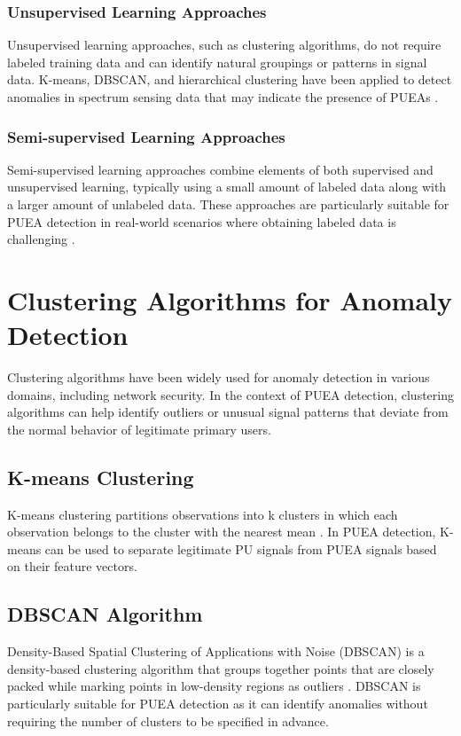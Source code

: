 \subsubsection{Unsupervised Learning Approaches}
Unsupervised learning approaches, such as clustering algorithms, do not require labeled training data and can identify natural groupings or patterns in signal data. K-means, DBSCAN, and hierarchical clustering have been applied to detect anomalies in spectrum sensing data that may indicate the presence of PUEAs \cite{rajasekar2015detection}.

\subsubsection{Semi-supervised Learning Approaches}
Semi-supervised learning approaches combine elements of both supervised and unsupervised learning, typically using a small amount of labeled data along with a larger amount of unlabeled data. These approaches are particularly suitable for PUEA detection in real-world scenarios where obtaining labeled data is challenging \cite{abdelaziz2018semi}.

\section{Clustering Algorithms for Anomaly Detection}
Clustering algorithms have been widely used for anomaly detection in various domains, including network security. In the context of PUEA detection, clustering algorithms can help identify outliers or unusual signal patterns that deviate from the normal behavior of legitimate primary users.

\subsection{K-means Clustering}
K-means clustering partitions observations into k clusters in which each observation belongs to the cluster with the nearest mean \cite{hartigan1979algorithm}. In PUEA detection, K-means can be used to separate legitimate PU signals from PUEA signals based on their feature vectors.

\subsection{DBSCAN Algorithm}
Density-Based Spatial Clustering of Applications with Noise (DBSCAN) is a density-based clustering algorithm that groups together points that are closely packed while marking points in low-density regions as outliers \cite{ester1996density}. DBSCAN is particularly suitable for PUEA detection as it can identify anomalies without requiring the number of clusters to be specified in advance.

